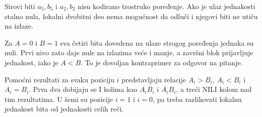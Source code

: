 Sirovi biti $a_5,b_5$ i $a_2,b_2$ nisu kodirano trostruko poređenje. Ako je ulaz jednakosti stalno nula, lokalni dvobitni deo nema mogućnost da odluči i njegovi biti ne utiču na izlaze.

Za $A=0$ i $B=1$ sva četiri bita dovedena na ulaze strogog poređenja jednaka su nuli. Prvi nivo zato daje nule na izlazima veće i manje, a završni blok prijavljuje jednakost, iako je $A<B$. To je dovoljan kontraprimer za odgovor na pitanje.

Pomoćni rezultati za svaku poziciju $i$ predstavljaju relacije $A_i>B_i$, $A_i<B_i$ i $A_i=B_i$. Prva dva dobijaju se I kolima kao $A_i\overline{B_i}$ i $\overline{A_i}B_i$, a treći NILI kolom nad tim rezultatima. U šemi su pozicije $i=1$ i $i=0$, pa treba razlikovati lokalnu jednakost bita od jednakosti celih reči.
